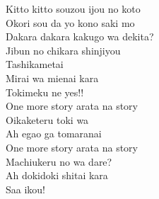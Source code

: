 \begin{multicols}{2}
Kitto kitto souzou ijou no koto\\
Okori sou da yo kono saki mo\\
Dakara dakara kakugo wa dekita?\\
Jibun no chikara shinjiyou\\

Tashikametai\\
Mirai wa mienai kara\\
Tokimeku ne yes!!\\

One more story arata na story\\
Oikaketeru toki wa\\
Ah egao ga tomaranai\\
One more story arata na story\\
Machiukeru no wa dare?\\
Ah dokidoki shitai kara\\
Saa ikou!
\end{multicols}

\ifdefined\COMPLETE
\else
	
\fi
